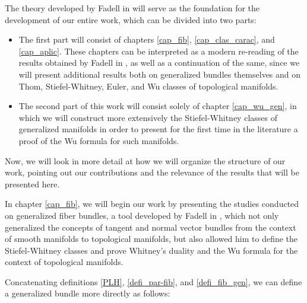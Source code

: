 \documentclass[12pt,oneside]{book}
\begin{document}
    The theory developed by Fadell in \cite{fadell_1} will serve as the foundation for the development 
    of our entire work, which can be divided into two parts:
        \begin{itemize}
            \item The first part will consist of chapters \ref{cap_fib}, \ref{cap_clas_carac}, and 
            \ref{cap_aplic}. These chapters can be interpreted as a modern re-reading of the results 
            obtained by Fadell in \cite{fadell_1}, as well as a continuation of the same, since we will 
            present additional results both on generalized bundles themselves and on Thom, 
            Stiefel-Whitney, Euler, and Wu classes of topological manifolds.
            \item The second part of this work will consist solely of chapter \ref{cap_wu_gen}, in which 
            we will construct more extensively the Stiefel-Whitney classes of generalized manifolds in 
            order to present for the first time in the literature a proof of the Wu formula for such 
            manifolds.
        \end{itemize}
    
    Now, we will look in more detail at how we will organize the structure of our work, pointing out our 
    contributions and the relevance of the results that will be presented here.
    
    In chapter \ref{cap_fib}, we will begin our work by presenting the studies conducted on generalized 
    fiber bundles, a tool developed by Fadell in \cite{fadell_1}, which 
    not only generalized the concepts of tangent and normal vector bundles from the context of smooth 
    manifolds to topological manifolds, but also allowed him to define the 
    Stiefel-Whitney classes and prove Whitney's 
    duality and the Wu formula for the context of topological 
    manifolds.
    
    Concatenating definitions \ref{PLH}, \ref{defi_par-fib}, and \ref{defi_fib_gen}, we can define a 
    generalized bundle more directly as follows:

    \
\end{document}
